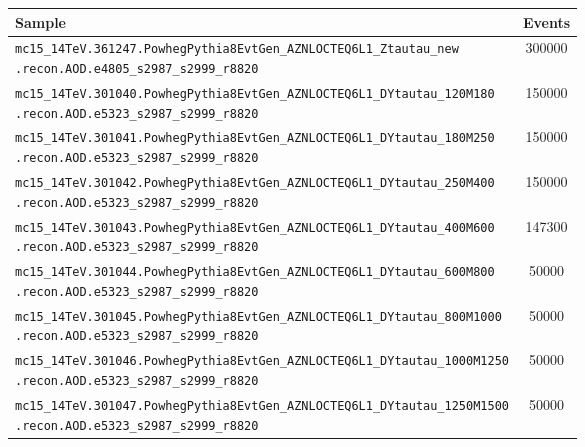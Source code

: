 \begin{table}[htbp]
  \centering
  {\small
  \begin{tabular}{p{13cm}S[table-format=6.0]}
    \toprule
    Sample & {Events} \\
    \midrule
    \texttt{mc15\_14TeV.361247.PowhegPythia8EvtGen\_AZNLOCTEQ6L1\_Ztautau\_new\newline\hspace*{1em}.recon.AOD.e4805\_s2987\_s2999\_r8820} & 300000 \\
    \texttt{mc15\_14TeV.301040.PowhegPythia8EvtGen\_AZNLOCTEQ6L1\_DYtautau\_120M180\newline\hspace*{1em}.recon.AOD.e5323\_s2987\_s2999\_r8820} & 150000 \\
    \texttt{mc15\_14TeV.301041.PowhegPythia8EvtGen\_AZNLOCTEQ6L1\_DYtautau\_180M250\newline\hspace*{1em}.recon.AOD.e5323\_s2987\_s2999\_r8820} & 150000 \\
    \texttt{mc15\_14TeV.301042.PowhegPythia8EvtGen\_AZNLOCTEQ6L1\_DYtautau\_250M400\newline\hspace*{1em}.recon.AOD.e5323\_s2987\_s2999\_r8820} & 150000 \\
    \texttt{mc15\_14TeV.301043.PowhegPythia8EvtGen\_AZNLOCTEQ6L1\_DYtautau\_400M600\newline\hspace*{1em}.recon.AOD.e5323\_s2987\_s2999\_r8820} & 147300 \\
    \texttt{mc15\_14TeV.301044.PowhegPythia8EvtGen\_AZNLOCTEQ6L1\_DYtautau\_600M800\newline\hspace*{1em}.recon.AOD.e5323\_s2987\_s2999\_r8820} & 50000 \\
    \texttt{mc15\_14TeV.301045.PowhegPythia8EvtGen\_AZNLOCTEQ6L1\_DYtautau\_800M1000\newline\hspace*{1em}.recon.AOD.e5323\_s2987\_s2999\_r8820} & 50000 \\
    \texttt{mc15\_14TeV.301046.PowhegPythia8EvtGen\_AZNLOCTEQ6L1\_DYtautau\_1000M1250\newline\hspace*{1em}.recon.AOD.e5323\_s2987\_s2999\_r8820} & 50000 \\
    \texttt{mc15\_14TeV.301047.PowhegPythia8EvtGen\_AZNLOCTEQ6L1\_DYtautau\_1250M1500\newline\hspace*{1em}.recon.AOD.e5323\_s2987\_s2999\_r8820} & 50000 \\

\end{tabular}}
\end{table}
